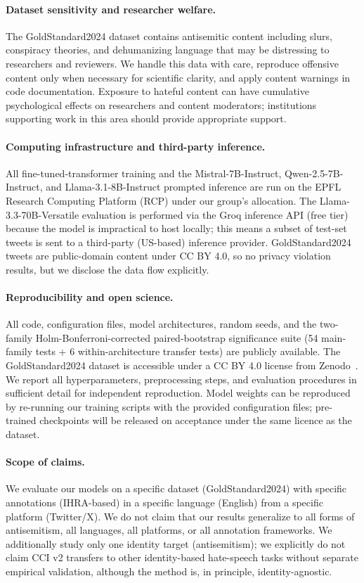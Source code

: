 \paragraph{Dataset sensitivity and researcher welfare.}
The GoldStandard2024 dataset contains antisemitic content including slurs, conspiracy theories, and dehumanizing language that may be distressing to researchers and reviewers. We handle this data with care, reproduce offensive content only when necessary for scientific clarity, and apply content warnings in code documentation. Exposure to hateful content can have cumulative psychological effects on researchers and content moderators; institutions supporting work in this area should provide appropriate support.

\paragraph{Computing infrastructure and third-party inference.}
All fine-tuned-transformer training and the Mistral-7B-Instruct, Qwen-2.5-7B-Instruct, and Llama-3.1-8B-Instruct prompted inference are run on the EPFL Research Computing Platform (RCP) under our group's allocation. The Llama-3.3-70B-Versatile evaluation is performed via the Groq inference API (free tier) because the model is impractical to host locally; this means a subset of test-set tweets is sent to a third-party (US-based) inference provider. GoldStandard2024 tweets are public-domain content under CC BY 4.0, so no privacy violation results, but we disclose the data flow explicitly.

\paragraph{Reproducibility and open science.}
All code, configuration files, model architectures, random seeds, and the two-family Holm-Bonferroni-corrected paired-bootstrap significance suite (54 main-family tests + 6 within-architecture transfer tests) are publicly available. The GoldStandard2024 dataset is accessible under a CC BY 4.0 license from Zenodo~\citep{jikeli2024goldstandard}. We report all hyperparameters, preprocessing steps, and evaluation procedures in sufficient detail for independent reproduction. Model weights can be reproduced by re-running our training scripts with the provided configuration files; pre-trained checkpoints will be released on acceptance under the same licence as the dataset.

\paragraph{Scope of claims.}
We evaluate our models on a specific dataset (GoldStandard2024) with specific annotations (IHRA-based) in a specific language (English) from a specific platform (Twitter/X). We do not claim that our results generalize to all forms of antisemitism, all languages, all platforms, or all annotation frameworks. We additionally study only one identity target (antisemitism); we explicitly do not claim CCI v2 transfers to other identity-based hate-speech tasks without separate empirical validation, although the method is, in principle, identity-agnostic.
